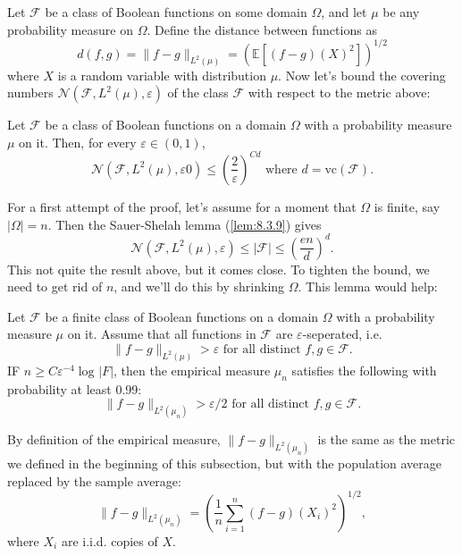 Let $\mathcal{F}$ be a class of Boolean functions on some domain $\Omega$, and let $\mu$ be any probability 
measure on $\Omega$. Define the distance between functions as 
\[ d(f, g) = \lVert f - g \rVert_{L^2(\mu)} = \left( \mathbb{E}\left[ (f - g)(X)^2 \right] \right)^{1/2} \]
where $X$ is a random variable with distribution $\mu$. Now let's bound the covering numbers 
$\mathcal{N}(\mathcal{F}, L^2(\mu), \varepsilon)$ of the class $\mathcal{F}$ with respect to the metric above:

\begin{theorem}
\label{thm:8.3.13}
Let $\mathcal{F}$ be a class of Boolean functions on a domain $\Omega$ with a probability measure $\mu$ on it. 
Then, for every $\varepsilon \in (0, 1)$, 
\[ \mathcal{N}(\mathcal{F}, L^2(\mu), \varepsilon0) \leq \left( \frac{2}{\varepsilon} \right)^{Cd} 
\text{ where } d = \mathrm{vc}(\mathcal{F}). \]
\end{theorem}

For a first attempt of the proof, let's assume for a moment that $\Omega$ is finite, say $|\Omega| = n$. 
Then the Sauer-Shelah lemma (\cref{lem:8.3.9}) gives 
\[ \mathcal{N}(\mathcal{F}, L^2(\mu), \varepsilon) \leq |\mathcal{F}| \leq \left( \frac{en}{d} \right)^d. \]
This not quite the result above, but it comes close. To tighten the bound, we need to get rid of $n$, and 
we'll do this by shrinking $\Omega$. This lemma would help: 

\begin{lemma}
\label{lem:8.3.14}
Let $\mathcal{F}$ be a finite class of Boolean functions on a domain $\Omega$ with a probability measure $\mu$ 
on it. Assume that all functions in $\mathcal{F}$ are $\varepsilon$-seperated, i.e.
\[ \lVert f - g \rVert_{L^2(\mu)} > \varepsilon \text{ for all distinct } f, g \in \mathcal{F}. \]
IF $n \geq C \varepsilon^{-4}\log_{}{|F|}$, then the empirical measure $\mu_n$ satisfies the following with 
probability at least 0.99:
\[ \lVert f - g \rVert_{L^2(\mu_n)} > \varepsilon / 2 \text{ for all distinct } f, g \in \mathcal{F}. \]
\end{lemma}

By definition of the empirical measure, $\lVert f - g \rVert_{L^2(\mu_n)}$ is the same as the metric we defined 
in the beginning of this subsection, but with the population average replaced by the sample average:
\[ \lVert f - g \rVert_{L^2(\mu_n)} = \left( \frac{1}{n}\sum_{i = 1}^{n}(f - g)(X_i)^2 \right)^{1/2}, \]
where $X_i$ are i.i.d. copies of $X$.


